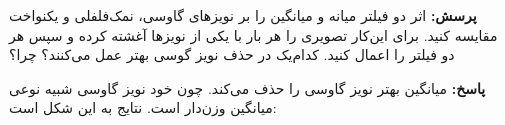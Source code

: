 \documentclass[12pt,a4paper]{article}
\theoremstyle{definition}
\theoremstyle{theorem}
\theoremstyle{definition}
\begin{document}
\textbf{پرسش:}
اثر دو فیلتر میانه و میانگین را بر نویزهای گاوسی، نمک‌فلفلی و یکنواخت مقایسه کنید. برای این‌کار تصویری را هر بار با یکی از نویزها آغشته کرده و سپس هر دو فیلتر را اعمال کنید. کدام‌یک در حذف نویز گوسی بهتر عمل می‌کنند؟ چرا؟

\textbf{پاسخ:}
میانگین بهتر نویز گاوسی را حذف می‌کند. چون خود نویز گاوسی شبیه نوعی میانگین وزن‌دار است.
نتایج به این شکل است:

\begin{center}
\vspace{0.5cm}
\end{center} 
\end{document}

